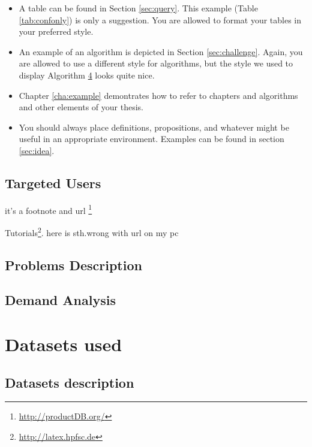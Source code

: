 \documentclass[11pt,titlepage,oneside,openany]{book}
\begin{document}
\begin{itemize}
	\item A table can be found in Section \ref{sec:query}. This example (Table \ref{tab:confonly}) is only a suggestion. You are allowed to format your tables in your preferred style.
	\item An example of an algorithm is depicted in Section \ref{sec:challenge}. Again, you are allowed to use a different style for algorithms, but the style we used to display Algorithm \ref{cha:dataset} looks quite nice.
	\item Chapter \ref{cha:example} demontrates how to refer to chapters and algorithms and other elements of your thesis.
	\item You should always place definitions, propositions, and whatever might be useful in an appropriate environment.  Examples can be found in section \ref{sec:idea}.
\end{itemize}




 
\section{Targeted Users}
 
it's  a footnote and url
\footnote{\url{http://productDB.org/}}


Tutorials\footnote{\url{http://latex.hpfsc.de}}.  
 here is sth.wrong with url on my pc


\section{Problems Description}

 

\section{Demand Analysis}



\chapter{Datasets used}
\label{cha:dataset}




\section{Datasets description}
\label{sec:datadesc}
\end{document}
